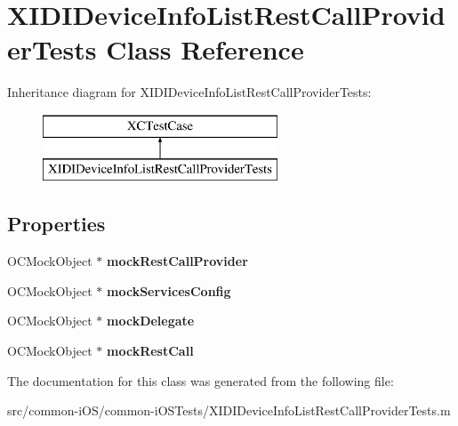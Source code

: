 \hypertarget{interface_x_i_d_i_device_info_list_rest_call_provider_tests}{}\section{X\+I\+D\+I\+Device\+Info\+List\+Rest\+Call\+Provider\+Tests Class Reference}
\label{interface_x_i_d_i_device_info_list_rest_call_provider_tests}
Inheritance diagram for X\+I\+D\+I\+Device\+Info\+List\+Rest\+Call\+Provider\+Tests\+:\begin{figure}[H]
\begin{center}
\leavevmode
\includegraphics[height=2.000000cm]{interface_x_i_d_i_device_info_list_rest_call_provider_tests}
\end{center}
\end{figure}
\subsection*{Properties}
\begin{DoxyCompactItemize}
\item 
\hypertarget{interface_x_i_d_i_device_info_list_rest_call_provider_tests_a2c80bb5f284614639aeb8b58d6858c85}{}\label{interface_x_i_d_i_device_info_list_rest_call_provider_tests_a2c80bb5f284614639aeb8b58d6858c85} 
O\+C\+Mock\+Object $\ast$ {\bfseries mock\+Rest\+Call\+Provider}
\item 
\hypertarget{interface_x_i_d_i_device_info_list_rest_call_provider_tests_af84deee94ad6fe904df6e11b07f79aa2}{}\label{interface_x_i_d_i_device_info_list_rest_call_provider_tests_af84deee94ad6fe904df6e11b07f79aa2} 
O\+C\+Mock\+Object $\ast$ {\bfseries mock\+Services\+Config}
\item 
\hypertarget{interface_x_i_d_i_device_info_list_rest_call_provider_tests_a102349f0807f4eca0adafce7af9693c8}{}\label{interface_x_i_d_i_device_info_list_rest_call_provider_tests_a102349f0807f4eca0adafce7af9693c8} 
O\+C\+Mock\+Object $\ast$ {\bfseries mock\+Delegate}
\item 
\hypertarget{interface_x_i_d_i_device_info_list_rest_call_provider_tests_a1a2fe4487756397e61facadf7c54da22}{}\label{interface_x_i_d_i_device_info_list_rest_call_provider_tests_a1a2fe4487756397e61facadf7c54da22} 
O\+C\+Mock\+Object $\ast$ {\bfseries mock\+Rest\+Call}
\end{DoxyCompactItemize}


The documentation for this class was generated from the following file\+:\begin{DoxyCompactItemize}
\item 
src/common-\/i\+O\+S/common-\/i\+O\+S\+Tests/X\+I\+D\+I\+Device\+Info\+List\+Rest\+Call\+Provider\+Tests.\+m\end{DoxyCompactItemize}
